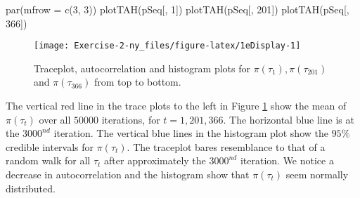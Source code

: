 \documentclass[
]{article}
\newenvironment{Shaded}{\begin{snugshade}}{\end{snugshade}}
\newcommand{\AttributeTok}[1]{\textcolor[rgb]{0.77,0.63,0.00}{#1}}
\newcommand{\DecValTok}[1]{\textcolor[rgb]{0.00,0.00,0.81}{#1}}
\newcommand{\FunctionTok}[1]{\textcolor[rgb]{0.00,0.00,0.00}{#1}}
\newcommand{\NormalTok}[1]{#1}
\begin{document}
\begin{Shaded}
\begin{Highlighting}[]
\FunctionTok{par}\NormalTok{(}\AttributeTok{mfrow =} \FunctionTok{c}\NormalTok{(}\DecValTok{3}\NormalTok{, }\DecValTok{3}\NormalTok{))}
\FunctionTok{plotTAH}\NormalTok{(pSeq[, }\DecValTok{1}\NormalTok{])}
\FunctionTok{plotTAH}\NormalTok{(pSeq[, }\DecValTok{201}\NormalTok{])}
\FunctionTok{plotTAH}\NormalTok{(pSeq[, }\DecValTok{366}\NormalTok{])}
\end{Highlighting}
\end{Shaded}

\begin{figure}

{\centering \texttt{[image: Exercise-2-ny\_files/figure-latex/1eDisplay-1]} 

}

\caption{Traceplot, autocorrelation and histogram plots for $\pi(\tau_1), \pi(\tau_{201})$ and $\pi(\tau_{366})$ from top to bottom.}\label{fig:1eDisplay}
\end{figure}

The vertical red line in the trace plots to the left in Figure \ref{fig:1eDisplay} show the mean of \(\pi(\tau_t)\) over all \(50000\) iterations, for \(t = 1, 201, 366\). The horizontal blue line is at the \(3000^{nd}\) iteration. The vertical blue lines in the histogram plot show the \(95\%\) credible intervals for \(\pi(\tau_t)\). The traceplot bares resemblance to that of a random walk for all \(\tau_t\) after approximately the \(3000^{nd}\) iteration. We notice a decrease in autocorrelation and the histogram show that \(\pi(\tau_t)\) seem normally distributed.
\end{document}
